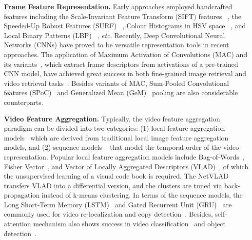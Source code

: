 \documentclass[10pt,twocolumn,letterpaper]{article}
\begin{document}
\textbf{Frame Feature Representation.}
Early approaches employed handcrafted features including the Scale-Invariant Feature Transform (SIFT) features ~\cite{jiang2007towards, lowe2004distinctive, wu2007practical}, the Speeded-Up Robust Features (SURF) ~\cite{bay2006surf, chou2015pattern}, Colour Histograms in HSV space ~\cite{hao2016stochastic, jing2019global, song2013effective}, and Local Binary Patterns (LBP) ~\cite{zhao2007dynamic, shang2010real, wu2014self}, \textit{etc.}
Recently, Deep Convolutional Neural Networks (CNNs) have proved to be versatile representation tools in recent approaches. The application of Maximum Activation of Convolutions (MAC) and its variants~\cite{razavian2016visual,zheng2016good,radenovic2016cnn,tolias2015particular,zheng2017sift,seddati2017towards,gordo2017end}, which extract frame descriptors from activations of a pre-trained CNN model, have achieved great success in both fine-grained image retrieval and video retrieval tasks~\cite{gordo2017end,kordopatis2017near,li2017ms,kordopatis2017dml,kordopatis2019visil}.
Besides variants of MAC, Sum-Pooled Convolutional features (SPoC)~\cite{babenko2015aggregating} and Generalized Mean (GeM)~\cite{hao2017unsupervised} pooling are also considerable counterparts.

\textbf{Video Feature Aggregation.}
Typically, the video feature aggregation paradigm can be divided into two categories: (1) local feature aggregation models~\cite{csurka2004visual,sivic2003video,perronnin2007fisher,jegou2010aggregating} which are derived from traditional local image feature aggregation models, and (2) sequence models ~\cite{hochreiter1997long,cho2014properties,donahue2015long,feng2018video,vaswani2017attention,Xia2019WeaklySE} that model the temporal order of the video representation.
Popular local feature aggregation models include Bag-of-Words~\cite{csurka2004visual,sivic2003video}, Fisher Vector~\cite{perronnin2007fisher}, and Vector of Locally Aggregated Descriptors (VLAD)~\cite{jegou2010aggregating}, of which the unsupervised learning of a visual code book is required. The NetVLAD~\cite{arandjelovic2016netvlad} transfers VLAD into a differential version, and the clusters are tuned via back-propagation instead of k-means clustering.
In terms of the sequence models, the Long Short-Term Memory (LSTM)~\cite{hochreiter1997long} and Gated Recurrent Unit (GRU)~\cite{cho2014properties} are commonly used for video re-localization and copy detection~\cite{feng2018video,hu2018learning}. Besides, self-attention mechanism also shows success in video classification~\cite{wang2018non} and object detection~\cite{hu2018relation}.
\end{document}
